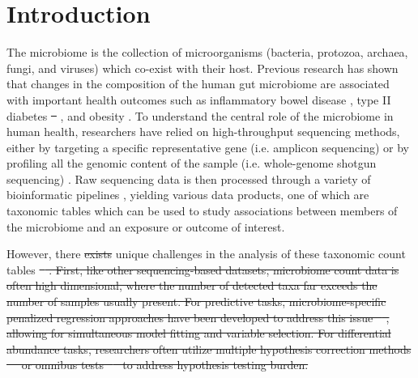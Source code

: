 \documentclass[10pt,letterpaper]{article}
\providecommand{\DIFaddtex}[1]{{\protect\color{blue}\uwave{#1}}} %
\providecommand{\DIFdeltex}[1]{{\protect\color{red}\sout{#1}}}                      %
\providecommand{\DIFaddbegin}{} %
\providecommand{\DIFaddend}{} %
\providecommand{\DIFdelbegin}{} %
\providecommand{\DIFdelend}{} %
\providecommand{\DIFadd}[1]{\texorpdfstring{\DIFaddtex{#1}}{#1}} %
\providecommand{\DIFdel}[1]{\texorpdfstring{\DIFdeltex{#1}}{}} %
\newcommand{\DIFscaledelfig}{0.5}
\newlength{\DIFdelgraphicswidth} %
\newlength{\DIFdelgraphicsheight} %
\newcommand{\DIFaddincludegraphics}[2][]{{\color{blue}\fbox{\DIFOincludegraphics[#1]{#2}}}} %
\newcommand{\DIFdelincludegraphics}[2][]{%
\sbox{\DIFdelgraphicsbox}{\DIFOincludegraphics[#1]{#2}}%
\settoboxwidth{\DIFdelgraphicswidth}{\DIFdelgraphicsbox} %
\settoboxtotalheight{\DIFdelgraphicsheight}{\DIFdelgraphicsbox} %
\scalebox{\DIFscaledelfig}{%
\parbox[b]{\DIFdelgraphicswidth}{\usebox{\DIFdelgraphicsbox}\\[-\baselineskip] \rule{\DIFdelgraphicswidth}{0em}}\llap{\resizebox{\DIFdelgraphicswidth}{\DIFdelgraphicsheight}{%
\setlength{\unitlength}{\DIFdelgraphicswidth}%
\begin{picture}(1,1)%
\thicklines\linethickness{2pt} %
{\color[rgb]{1,0,0}\put(0,0){\framebox(1,1){}}}%
{\color[rgb]{1,0,0}\put(0,0){\line( 1,1){1}}}%
{\color[rgb]{1,0,0}\put(0,1){\line(1,-1){1}}}%
\end{picture}%
}\hspace*{3pt}}} %
} %
\DeclareRobustCommand{\DIFaddbegin}{\DIFOaddbegin \let\includegraphics\DIFaddincludegraphics} %
\DeclareRobustCommand{\DIFaddend}{\DIFOaddend \let\includegraphics\DIFOincludegraphics} %
\DeclareRobustCommand{\DIFdelbegin}{\DIFOdelbegin \let\includegraphics\DIFdelincludegraphics} %
\DeclareRobustCommand{\DIFdelend}{\DIFOaddend \let\includegraphics\DIFOincludegraphics} %
\begin{document}
\section*{Introduction} \DIFaddbegin \label{introduction}
\DIFaddend The microbiome is the collection of microorganisms (bacteria, protozoa, archaea, fungi, and viruses) which co-exist with their host. Previous research has shown that changes in the composition of the human gut microbiome are associated with important health outcomes such as inflammatory bowel disease \cite{proctor2019}, type II diabetes \DIFdelbegin \DIFdel{\mbox{%
\cite{sharma2019}}\hspace{0pt}%
}\DIFdelend \DIFaddbegin \DIFadd{\mbox{%
\cite{sharma2019a}}\hspace{0pt}%
}\DIFaddend , and obesity \cite{aoun2020}. To understand the central role of the microbiome in human health, researchers have relied on high-throughput sequencing methods, either by targeting a specific representative gene (i.e. amplicon sequencing) or by profiling all the genomic content of the sample (i.e. whole-genome shotgun sequencing) \cite{cho2012}. Raw sequencing data is then processed through a variety of bioinformatic pipelines \cite{callahan2016, truong2015}, yielding various data products, one of which are taxonomic tables which can be used to study associations between members of the microbiome and an exposure or outcome of interest. 

However, there \DIFdelbegin \DIFdel{exists }\DIFdelend \DIFaddbegin \DIFadd{are }\DIFaddend unique challenges in the analysis of these taxonomic count tables \DIFdelbegin \DIFdel{\mbox{%
\cite{li2019,li2015}}\hspace{0pt}%
. First, like other sequencing-based datasets, microbiome count data is often high dimensional, where the number of detected taxa far exceeds the number of samples usually present. For predictive tasks, microbiome-specific penalized regression approaches have been developed to address this issue \mbox{%
\cite{shi2016}}\hspace{0pt}%
, allowing for simultaneous model fitting and variable selection. For differential abundance tasks, researchers often utilize multiple hypothesis correction methods \mbox{%
\cite{sankaran2014,benjamini1995} }\hspace{0pt}%
or omnibus tests \mbox{%
\cite{chen2018} }\hspace{0pt}%
to address hypothesis testing burden. 
}%
\end{document}
